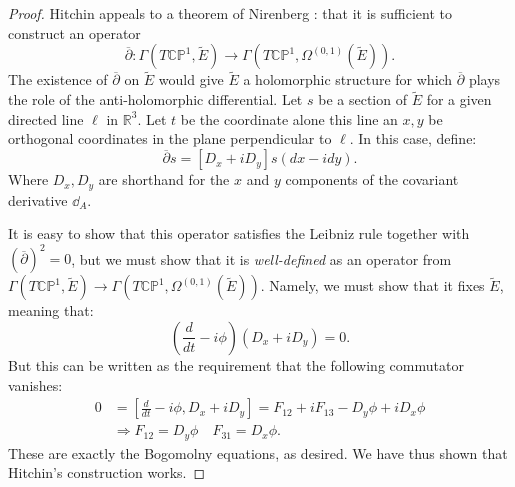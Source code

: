 	\begin{proof}
		Hitchin appeals to a theorem of Nirenberg \cite{nirenberg1957}: that it is sufficient to construct an operator
		$$\overline \partial: \Gamma(T \mathbb{CP}^1, \tilde E) \to \Gamma(T \mathbb{CP}^1, \Omega^{(0,1)}(\tilde E)).$$
		The existence of $\overline \partial$ on $\tilde E$ would give $\tilde E$ a holomorphic structure for which $\overline \partial$ plays the role of the anti-holomorphic differential.
		Let $s$ be a section of $\tilde E$ for a given directed line $\ell$ in $\mathbb R^3$. Let $t$ be the coordinate alone this line an $x,y$ be orthogonal coordinates in the plane perpendicular to $\ell$. In this case, define:
		\begin{equation}
			\overline \partial s = \left[ D_x + i D_y \right] s (dx - i dy).
		\end{equation}
		Where $D_x, D_y$ are shorthand for the $x$ and $y$ components of the covariant derivative $\dd_A$.
		
		It is easy to show that this operator satisfies the Leibniz rule together with $(\overline \partial)^2 = 0$, but we must show that it is \emph{well-defined} as an operator from $\Gamma(T \mathbb{CP}^1, \tilde E) \to \Gamma(T \mathbb{CP}^1, \Omega^{(0,1)}(\tilde E))$. Namely, we must show that it fixes $\tilde E$, meaning that:
		\begin{equation}
			\left(\frac{d}{dt} - i \phi \right)\left(D_x + i D_y \right) = 0.
		\end{equation}
		But this can be written as the requirement that the following commutator vanishes:
		\begin{equation}
			\begin{aligned}
				0 &= \left[\frac{d}{dt} - i \phi, D_x + i D_y \right] = F_{12} + i F_{13} - D_y \phi + i D_x \phi\\
				& \Rightarrow F_{12} = D_y \phi \quad F_{31} = D_x \phi.
			\end{aligned}
		\end{equation}
		These are exactly the Bogomolny equations, as desired. We have thus shown that Hitchin's construction works.
	\end{proof}
